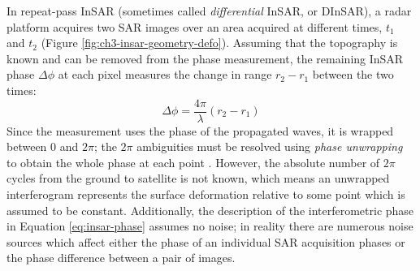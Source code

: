 In repeat-pass InSAR (sometimes called \emph{differential} InSAR, or DInSAR), a radar platform acquires two SAR images over an area acquired at different times, $t_1$ and $t_2$ (Figure \ref{fig:ch3-insar-geometry-defo}). Assuming that the topography is known and can be removed from the phase measurement, the remaining InSAR phase $\Delta \phi$ at each pixel measures the change in range $r_2 - r_1$ between the two times:
\begin{equation}
	\Delta \phi = \frac{4 \pi}{\lambda}(r_2 - r_1)   \label{eq:insar-phase}
\end{equation} 
Since the measurement uses the phase of the propagated waves, it is wrapped between $0$ and $2\pi$;
the $2\pi$ ambiguities must be resolved using \emph{phase unwrapping} to obtain the whole phase at each point
\cite{Goldstein1988SatelliteRadarInterferometry, Chen2001TwoDimensionalPhase}.
However, the absolute number of $2\pi$ cycles from the ground to satellite is not known, which means an unwrapped interferogram represents the surface deformation relative to some point which is assumed to be constant.
Additionally, the description of the interferometric phase in Equation \eqref{eq:insar-phase} assumes no noise; in reality there are numerous noise sources which affect either the phase of an individual SAR acquisition phases or the phase difference between a pair of images.




